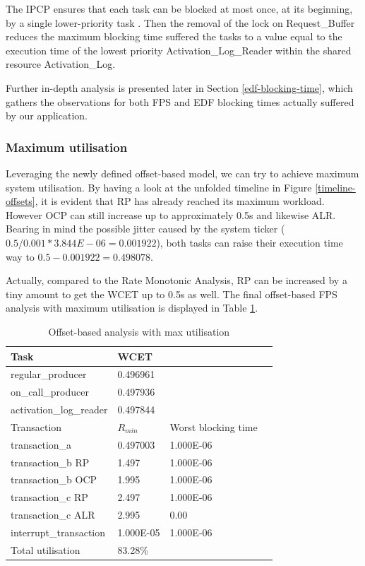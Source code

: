 \documentclass{article}
\begin{document}
The IPCP ensures that each task can be blocked at most once, at its beginning, by a single lower-priority task \cite{ada-pcp}. Then the removal of the lock on Request\_Buffer reduces the maximum blocking time suffered the tasks to a value equal to the execution time of the lowest priority Activation\_Log\_Reader within the shared resource Activation\_Log.

Further in-depth analysis is presented later in Section \ref{edf-blocking-time}, which gathers the observations for both FPS and EDF blocking times actually suffered by our application.

\subsubsection{Maximum utilisation} \label{maximum-utilisation}

Leveraging the newly defined offset-based model, we can try to achieve maximum system utilisation. By having a look at the unfolded timeline in Figure \ref{timeline-offsets}, it is evident that RP has already reached its maximum workload. However OCP can still increase up to approximately 0.5s and likewise ALR. Bearing in mind the possible jitter caused by the system ticker ($0.5 / 0.001 * 3.844E-06 = 0.001922$), both tasks can raise their execution time way to $0.5 - 0.001922 = 0.498078$.

Actually, compared to the Rate Monotonic Analysis, RP can be increased by a tiny amount to get the WCET up to 0.5s as well. The final offset-based FPS analysis with maximum utilisation is displayed in Table \ref{tab:off-approx-w-pr-max-utilisation}.

\begin{table}[!htbp]
   \centering
   \begin{tabular}{llll}
    \toprule
    Task & WCET \\
    \midrule
    regular\_producer & 0.496961 \\
    on\_call\_producer & 0.497936 \\
    activation\_log\_reader & 0.497844 \\
    \toprule
    \toprule
    Transaction & $R_{min}$ & Worst blocking time \\
    \midrule
    transaction\_a & 0.497003 &  1.000E-06 \\
    transaction\_b RP & 1.497 & 1.000E-06 \\
    transaction\_b OCP & 1.995 & 1.000E-06 \\
    transaction\_c RP & 2.497 & 1.000E-06 \\
    transaction\_c ALR & 2.995 & 0.00 \\
    interrupt\_transaction & 1.000E-05 & 1.000E-06 \\
    \toprule
    \toprule
    Total utilisation & 83.28\% \\
   \end{tabular}
   \caption{Offset-based analysis with max utilisation}
   \label{tab:off-approx-w-pr-max-utilisation}
 \end{table}
\end{document}
